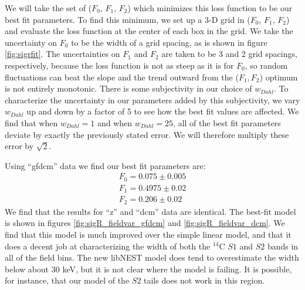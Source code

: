 We will take the set of ($F_0$, $F_1$, $F_2$) which minimizes this loss function to be our best fit parameters. To find this minimum, we set up a 3-D grid in ($F_0$, $F_1$, $F_2$) and evaluate the loss function at the center of each box in the grid. We take the uncertainty on $F_0$ to be the width of a grid spacing, as is shown in figure \ref{fig:sigrfit}. The uncertainties on $F_1$ and $F_2$ are taken to be 3 and 2 grid spacings, respectively, because the loss function is not as steep as it is for $F_0$, so random fluctuations can beat the slope and the trend outward from the ($F_1,F_2$) optimum is not entirely monotonic. There is some subjectivity in our choice of $w_{Dahl}$. To characterize the uncertainty in our parameters added by this subjectivity, we vary $w_{Dahl}$ up and down by a factor of 5 to see how the best fit values are affected. We find that when $w_{Dahl}=1$ and when $w_{Dahl}=25$, all of the best fit parameters deviate by exactly the previously stated error. We will therefore multiply these error by $\sqrt{2}$.

Using ``gfdcm'' data we find our best fit parameters are:
\begin{equation}\label{eq:sigrbestfit}
\begin{split}
F_0=0.075 \pm 0.005\\
F_1=0.4975 \pm 0.02\\
F_2=0.206 \pm 0.02
\end{split}
\end{equation}
We find that the results for ``z'' and ``dcm'' data are identical. The best-fit model is shown in figures \ref{fig:sigR_fieldvar_gfdcm} and \ref{fig:sigR_fieldvar_dcm}. We find that this model is much improved over the simple linear model, and that it does a decent job at characterizing the width of both the $^{14}$C $S1$ and $S2$ bands in all of the field bins. The new libNEST model does tend to overestimate the width below about 30 keV, but it is not clear where the model is failing. It is possible, for instance, that our model of the $S2$ tails does not work in this region.

